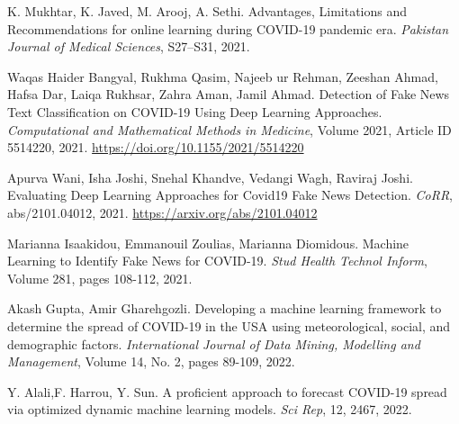 \documentclass[12pt]{article}
\begin{document}
\begin{thebibliography}{9}
K. Mukhtar, K. Javed, M. Arooj, A. Sethi. Advantages, Limitations and Recommendations for online learning during COVID-19 pandemic era. \textit{Pakistan Journal of Medical Sciences}, S27–S31, 2021. 

 Waqas Haider Bangyal, Rukhma Qasim, Najeeb ur Rehman, Zeeshan Ahmad, Hafsa Dar, Laiqa Rukhsar, Zahra Aman, Jamil Ahmad. Detection of Fake News Text Classification on COVID-19 Using Deep Learning Approaches. \textit{Computational and Mathematical Methods in Medicine}, Volume 2021, Article ID 5514220, 2021. \href{https://doi.org/10.1155/2021/5514220}{https://doi.org/10.1155/2021/5514220}

 Apurva Wani, Isha Joshi, Snehal Khandve, Vedangi Wagh, Raviraj Joshi. Evaluating Deep Learning Approaches for Covid19 Fake News Detection. \textit{CoRR}, abs/2101.04012, 2021. \href{https://arxiv.org/abs/2101.04012}{https://arxiv.org/abs/2101.04012}

 Marianna Isaakidou, Emmanouil Zoulias, Marianna Diomidous. Machine Learning to Identify Fake News for COVID-19. \textit{Stud Health Technol Inform}, Volume 281, pages 108-112, 2021.

Akash Gupta, Amir Gharehgozli. Developing a machine learning framework to determine the spread of COVID-19 in the USA using meteorological, social, and demographic factors. \textit{International Journal of Data Mining, Modelling and Management}, Volume 14, No. 2, pages 89-109, 2022.

Y. Alali,F. Harrou, Y. Sun. A proficient approach to forecast COVID-19 spread via optimized dynamic machine learning models. \textit{Sci Rep}, 12, 2467, 2022.


\end{thebibliography}
\end{document}
